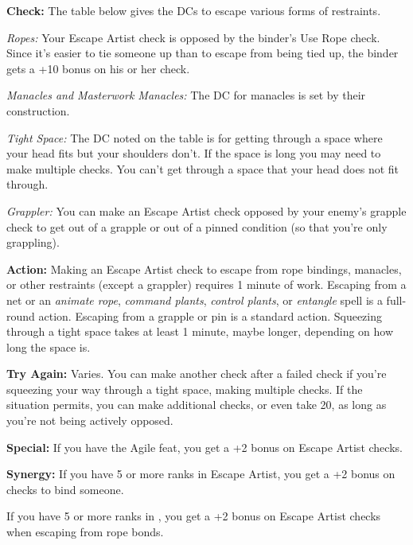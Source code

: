 \textbf{Check:} The table below gives the DCs to escape various forms of restraints.

\textit{Ropes:} Your Escape Artist check is opposed by the binder's Use Rope check. Since it's easier to tie someone up than to escape from being tied up, the binder gets a +10 bonus on his or her check.

\textit{Manacles and Masterwork Manacles:} The DC for manacles is set by their construction.

\textit{Tight Space:} The DC noted on the table is for getting through a space where your head fits but your shoulders don't. If the space is long you may need to make multiple checks. You can't get through a space that your head does not fit through.

\textit{Grappler:} You can make an Escape Artist check opposed by your enemy's grapple check to get out of a grapple or out of a pinned condition (so that you're only grappling).


\textbf{Action:} Making an Escape Artist check to escape from rope bindings, manacles, or other restraints (except a grappler) requires 1 minute of work. Escaping from a net or an \emph{animate rope}, \emph{command plants}, \emph{control plants}, or \emph{entangle} spell is a full-round action. Escaping from a grapple or pin is a standard action. Squeezing through a tight space takes at least 1 minute, maybe longer, depending on how long the space is.

\textbf{Try Again:} Varies. You can make another check after a failed check if you're squeezing your way through a tight space, making multiple checks. If the situation permits, you can make additional checks, or even take 20, as long as you're not being actively opposed.

\textbf{Special:} If you have the Agile feat, you get a +2 bonus on Escape Artist checks.

\textbf{Synergy:} If you have 5 or more ranks in Escape Artist, you get a +2 bonus on  checks to bind someone.

If you have 5 or more ranks in , you get a +2 bonus on Escape Artist checks when escaping from rope bonds.